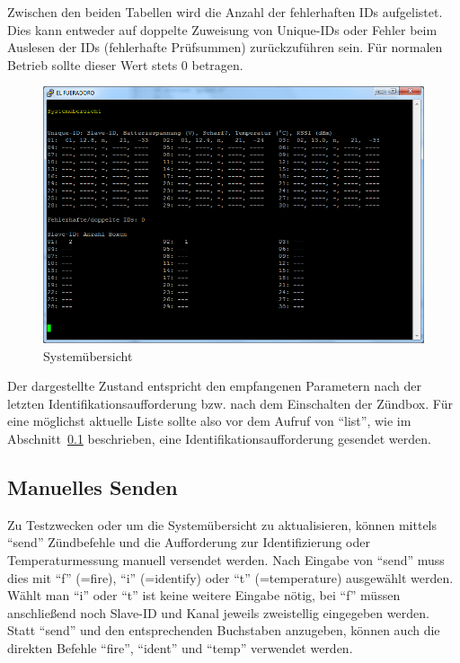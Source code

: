 \documentclass[paper=a4, parskip, numbers=noenddot, toc=listof, headsepline]{scrbook}
\begin{document}
				Zwischen den beiden Tabellen wird die Anzahl der fehlerhaften IDs aufgelistet. Dies kann entweder auf doppelte Zuweisung von Unique-IDs oder Fehler beim Auslesen der IDs (fehlerhafte Prüfsummen) zurückzuführen sein. Für normalen Betrieb sollte dieser Wert stets 0 betragen.

				\begin{figure}
					\centering
					\includegraphics[width=.8\textwidth]{Bilder/list}
					\caption{Systemübersicht}
					\label{fig:list}
				\end{figure}

				Der dargestellte Zustand entspricht den empfangenen Parametern nach der letzten Identifikationsaufforderung bzw. nach dem Einschalten der Zündbox. Für eine möglichst aktuelle Liste sollte also vor dem Aufruf von \enquote{list}, wie im Abschnitt~\ref{sec:manuellessenden} beschrieben, eine Identifikationsaufforderung gesendet werden.

			\subsection{Manuelles Senden}
				\label{sec:manuellessenden}

				Zu Testzwecken oder um die Systemübersicht zu aktualisieren, können mittels \enquote{send} Zündbefehle und die Aufforderung zur Identifizierung oder Temperaturmessung manuell versendet werden. Nach Eingabe von \enquote{send} muss dies mit \enquote{f} (=fire), \enquote{i} (=identify) oder \enquote{t} (=temperature) ausgewählt werden. Wählt man \enquote{i} oder \enquote{t} ist keine weitere Eingabe nötig, bei \enquote{f} müssen anschließend noch Slave-ID und Kanal jeweils zweistellig eingegeben werden. Statt \enquote{send} und den entsprechenden Buchstaben anzugeben, können auch die direkten Befehle \mbox{\enquote{fire}}, \mbox{\enquote{ident}} und \mbox{\enquote{temp}} verwendet werden.
\end{document}
